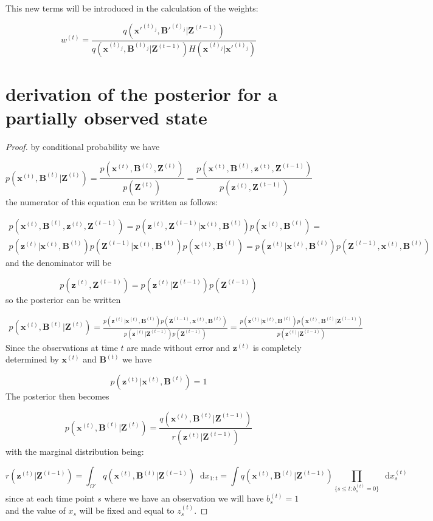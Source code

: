 \documentclass[11pt,a4paper]{article}
\renewcommand{\vec}[1]{\mathbf{#1}}
\newcommand*\diff{\mathop{}\!\mathrm{d}}
\begin{document}
This new terms will be introduced in the calculation of the weights:

\[
w^{(t)} = \frac{q(\vec{x'}^{(t)_j}, \vec{B'}^{(t)_j} | \vec{Z}^{(t-1)}) }{q(\vec{x}^{(t)_j}, \vec{B}^{(t)_j} | \vec{Z}^{(t-1)}) H(\vec{x}^{(t)_j}|\vec{x'}^{(t)_j}) }
\]

\section{derivation of the posterior for a partially observed state}

\begin{proof}

by conditional probability we have

\[
p(\vec{x}^{(t)},\vec{B}^{(t)} | \vec{Z}^{(t)}) = \frac{p(\vec{x}^{(t)},\vec{B}^{(t)}, \vec{Z}^{(t)})}{p(\vec{Z}^{(t)})} = \frac{p(\vec{x}^{(t)},\vec{B}^{(t)}, \vec{z}^{(t)}, \vec{Z}^{(t-1)})}{p(\vec{z}^{(t)},\vec{Z}^{(t-1)})}
\]
the numerator of this equation can be written as follows:

\begin{multline*}
p(\vec{x}^{(t)},\vec{B}^{(t)}, \vec{z}^{(t)}, \vec{Z}^{(t-1)}) = p(\vec{z}^{(t)}, \vec{Z}^{(t-1)} | \vec{x}^{(t)},\vec{B}^{(t)})p(\vec{x}^{(t)},\vec{B}^{(t)}) = \\ p(\vec{z}^{(t)} | \vec{x}^{(t)},\vec{B}^{(t)}) p(\vec{Z}^{(t-1)} | \vec{x}^{(t)},\vec{B}^{(t)})p(\vec{x}^{(t)},\vec{B}^{(t)}) = p(\vec{z}^{(t)} | \vec{x}^{(t)},\vec{B}^{(t)}) p(\vec{Z}^{(t-1)}, \vec{x}^{(t)} , \vec{B}^{(t)})
\end{multline*}
and the denominator will be

\[
p(\vec{z}^{(t)},\vec{Z}^{(t-1)}) = p(\vec{z}^{(t)} | \vec{Z}^{(t-1)}) p(\vec{Z}^{(t-1)}) 
\]
so the posterior can be written

\begin{multline*}
p(\vec{x}^{(t)},\vec{B}^{(t)} | \vec{Z}^{(t)}) = \frac{p(\vec{z}^{(t)} | \vec{x}^{(t)},\vec{B}^{(t)}) p(\vec{Z}^{(t-1)}, \vec{x}^{(t)} , \vec{B}^{(t)})}{p(\vec{z}^{(t)} | \vec{Z}^{(t-1)}) p(\vec{Z}^{(t-1)}) } = \frac{p(\vec{z}^{(t)} | \vec{x}^{(t)},\vec{B}^{(t)}) p(\vec{x}^{(t)} , \vec{B}^{(t)} | \vec{Z}^{(t-1)})}{p(\vec{z}^{(t)} | \vec{Z}^{(t-1)})}
\end{multline*}
Since the observations at time $t$ are made without error and $\vec{z}^{(t)}$ is completely determined by $\vec{x}^{(t)}$ and $\vec{B}^{(t)}$ we have

\[
p(\vec{z}^{(t)} | \vec{x}^{(t)}, \vec{B}^{(t)}) = 1
\]
The posterior then becomes

\[
p(\vec{x}^{(t)},\vec{B}^{(t)} | \vec{Z}^{(t)}) = \frac{q(\vec{x}^{(t)} , \vec{B}^{(t)} | \vec{Z}^{(t-1)})}{r(\vec{z}^{(t)} | \vec{Z}^{(t-1)})}
\]
with the marginal distribution being:

\[
r(\vec{z}^{(t)} | \vec{Z}^{(t-1)}) = \int_{\Omega'} q(\vec{x}^{(t)}, \vec{B}^{(t)}|\vec{Z}^{(t-1)}) \diff x_{1:t} = \int q(\vec{x}^{(t)}, \vec{B}^{(t)}|\vec{Z}^{(t-1)}) \prod_{\{s \leq t: b_s^{(t)} = 0\}} \diff x_s^{(t)}
\]
since at each time point $s$ where we have an observation we will have $b^{(t)}_s=1$ and the value of $x_s$ will be fixed and equal to $z^{(t)}_s$.

\end{proof}
\end{document}
